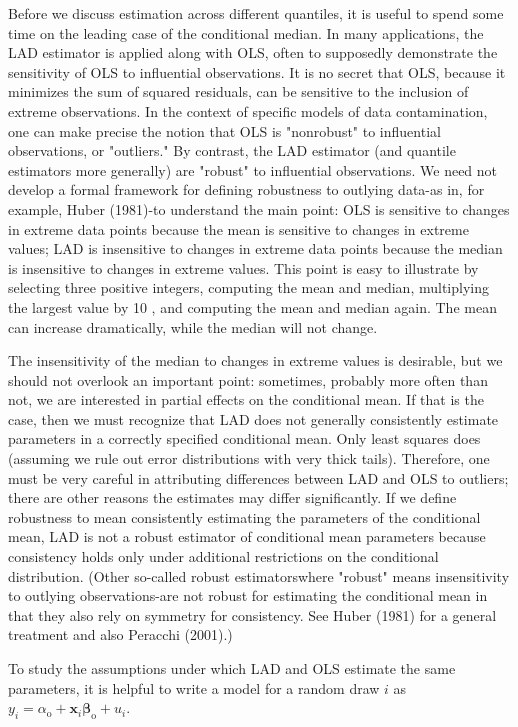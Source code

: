 \documentclass[10pt]{article}
\begin{document}
Before we discuss estimation across different quantiles, it is useful to spend some time on the leading case of the conditional median. In many applications, the LAD estimator is applied along with OLS, often to supposedly demonstrate the sensitivity of OLS to influential observations. It is no secret that OLS, because it minimizes the sum of squared residuals, can be sensitive to the inclusion of extreme observations. In the context of specific models of data contamination, one can make precise the notion that OLS is "nonrobust" to influential observations, or "outliers." By contrast, the LAD estimator (and quantile estimators more generally) are "robust" to influential observations. We need not develop a formal framework for defining robustness to outlying data-as in, for example, Huber (1981)-to understand the main point: OLS is sensitive to changes in extreme data points because the mean is sensitive to changes in extreme values; LAD is insensitive to changes in extreme data points because the median is insensitive to changes in extreme values. This point is easy to illustrate by selecting three positive integers, computing the mean and median, multiplying the largest value by 10 , and computing the mean and median again. The mean can increase dramatically, while the median will not change.

The insensitivity of the median to changes in extreme values is desirable, but we should not overlook an important point: sometimes, probably more often than not, we are interested in partial effects on the conditional mean. If that is the case, then we must recognize that LAD does not generally consistently estimate parameters in a correctly specified conditional mean. Only least squares does (assuming we rule out error distributions with very thick tails). Therefore, one must be very careful in attributing differences between LAD and OLS to outliers; there are other reasons the estimates may differ significantly. If we define robustness to mean consistently estimating the parameters of the conditional mean, LAD is not a robust estimator of conditional mean parameters because consistency holds only under additional restrictions on the conditional distribution. (Other so-called robust estimatorswhere "robust" means insensitivity to outlying observations-are not robust for estimating the conditional mean in that they also rely on symmetry for consistency. See Huber (1981) for a general treatment and also Peracchi (2001).)

To study the assumptions under which LAD and OLS estimate the same parameters, it is helpful to write a model for a random draw $i$ as\\
$y_{i}=\alpha_{\mathrm{o}}+\mathbf{x}_{i} \boldsymbol{\beta}_{\mathrm{o}}+u_{i}$.
\end{document}
